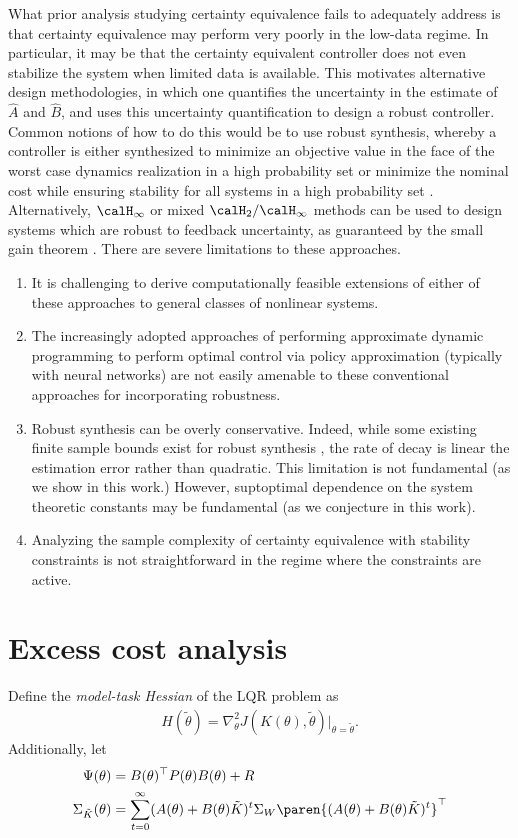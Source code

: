 What prior analysis studying certainty equivalence fails to adequately address is that certainty equivalence may perform very poorly in the low-data regime. In particular, it may be that the certainty equivalent controller does not even stabilize the system when limited data is available. This motivates alternative design methodologies, in which one quantifies the uncertainty in the estimate of $\hat A$ and $\hat B$, and uses this uncertainty quantification to design a robust controller. Common notions of how to do this would be to use robust synthesis, whereby a controller is either synthesized to minimize an objective value in the face of the worst case dynamics realization in a high probability set or minimize the nominal cost while ensuring stability for all systems in a high probability set \citep{gevers2005identification, dean2020sample}. Alternatively, $\calH_\infty$ or mixed $\calH_2/\calH_\infty$ methods can be used to design systems which are robust to feedback uncertainty, as guaranteed by the small gain theorem \citep{zhou1996robust}. 
There are severe limitations to these approaches. 
\begin{enumerate}
    \item It is challenging to derive computationally feasible extensions of either of these approaches to general classes of nonlinear systems. 
    \item The increasingly adopted approaches of performing approximate dynamic programming to perform optimal control via policy approximation (typically with neural networks) are not easily amenable to these conventional approaches for incorporating robustness. 
    \item Robust synthesis can be overly conservative. Indeed, while some existing finite sample bounds exist for robust synthesis \citep{dean2020sample}, the rate of decay is linear the estimation error rather than quadratic. This limitation is not fundamental (as we show in this work.) However, suptoptimal dependence on the system theoretic constants may be fundamental (as we conjecture in this work). 
    \item Analyzing the sample complexity of certainty equivalence with stability constraints is not straightforward in the regime where the constraints are active. 
\end{enumerate}

\section{Excess cost analysis}
Define the \emph{model-task Hessian} of the LQR problem as 
\begin{align*}
    H(\tilde \theta) = \nabla_{\theta}^2 J(K(\theta), \tilde \theta) \vert_{\theta= \tilde \theta}.
\end{align*}
Additionally, let
\begin{align*}
    \Psi(\theta) &= B(\theta)^\top P(\theta) B(\theta) + R \\
    \Sigma_{\tilde K}(\theta) &= \sum_{t=0}^\infty (A(\theta) + B(\theta) \tilde K)^t \Sigma_W\paren{(A(\theta) + B(\theta) \tilde K)^t }^\top
\end{align*}

